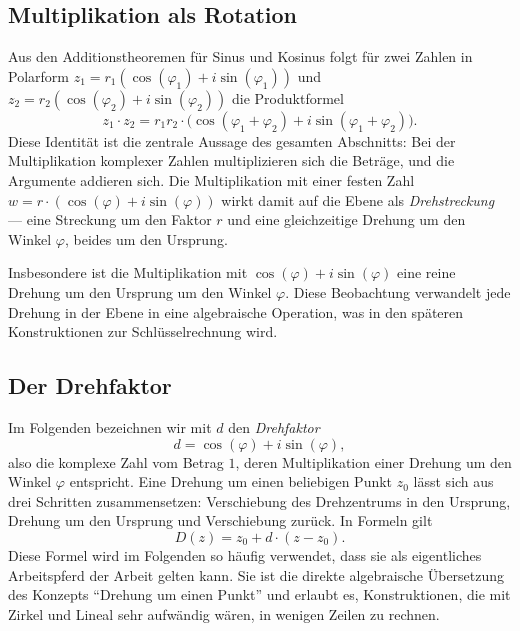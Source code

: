 \subsection{Multiplikation als Rotation
\label{komplex:subsection:rotation}}
Aus den Additionstheoremen für Sinus und Kosinus folgt für zwei Zahlen in
Polarform $z_1 = r_1 ( \cos(\varphi_1) + i \sin(\varphi_1) )$
und $z_2 = r_2 ( \cos(\varphi_2) + i \sin(\varphi_2) )$ die Produktformel
\begin{equation}
z_1 \cdot z_2
=
r_1 r_2 \cdot \bigl( \cos(\varphi_1 + \varphi_2)
                   + i \sin(\varphi_1 + \varphi_2) \bigr) .
\label{komplex:eq:produkt-polar}
\end{equation}
Diese Identität ist die zentrale Aussage des gesamten Abschnitts:
Bei der Multiplikation komplexer Zahlen multiplizieren sich die Beträge,
und die Argumente addieren sich.
Die Multiplikation mit einer festen Zahl
$w = r \cdot ( \cos(\varphi) + i \sin(\varphi) )$
wirkt damit auf die Ebene als \emph{Drehstreckung} ---
eine Streckung um den Faktor $r$ und eine gleichzeitige Drehung um den
Winkel $\varphi$, beides um den Ursprung.

Insbesondere ist die Multiplikation mit
$\cos(\varphi) + i \sin(\varphi)$
eine reine Drehung um den Ursprung um den Winkel $\varphi$.
Diese Beobachtung verwandelt jede Drehung in der Ebene in eine algebraische
Operation, was in den späteren Konstruktionen zur Schlüsselrechnung wird.

%
%
\subsection{Der Drehfaktor
\label{komplex:subsection:drehfaktor}}
Im Folgenden bezeichnen wir mit $d$ den \emph{Drehfaktor}
%
\begin{equation}
d
=
\cos(\varphi) + i \sin(\varphi) ,
\label{komplex:eq:drehfaktor}
\end{equation}
also die komplexe Zahl vom Betrag $1$, deren Multiplikation einer Drehung
um den Winkel $\varphi$ entspricht.
Eine Drehung um einen beliebigen Punkt $z_0$ lässt sich aus drei Schritten
zusammensetzen:
Verschiebung des Drehzentrums in den Ursprung,
Drehung um den Ursprung
und Verschiebung zurück.
In Formeln gilt
\begin{equation}
D(z)
=
z_0 + d \cdot (z - z_0) .
\label{komplex:eq:drehung-allg}
\end{equation}
Diese Formel wird im Folgenden so häufig verwendet,
dass sie als eigentliches Arbeitspferd der Arbeit gelten kann.
Sie ist die direkte algebraische Übersetzung des Konzepts ``Drehung um
einen Punkt'' und erlaubt es, Konstruktionen, die mit Zirkel und Lineal
sehr aufwändig wären, in wenigen Zeilen zu rechnen.

